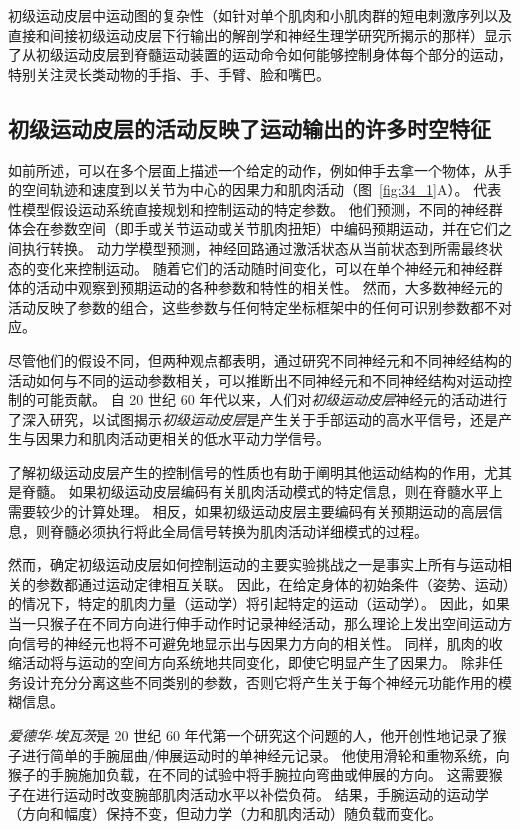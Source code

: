 初级运动皮层中运动图的复杂性（如针对单个肌肉和小肌肉群的短电刺激序列以及直接和间接初级运动皮层下行输出的解剖学和神经生理学研究所揭示的那样）显示了从初级运动皮层到脊髓运动装置的运动命令如何能够控制身体每个部分的运动，特别关注灵长类动物的手指、手、手臂、脸和嘴巴。



\subsection{初级运动皮层的活动反映了运动输出的许多时空特征}

如前所述，可以在多个层面上描述一个给定的动作，例如伸手去拿一个物体，从手的空间轨迹和速度到以关节为中心的因果力和肌肉活动（图~\ref{fig:34_1}A）。
代表性模型假设运动系统直接规划和控制运动的特定参数。
他们预测，不同的神经群体会在参数空间（即手或关节运动或关节肌肉扭矩）中编码预期运动，并在它们之间执行转换。
动力学模型预测，神经回路通过激活状态从当前状态到所需最终状态的变化来控制运动。
随着它们的活动随时间变化，可以在单个神经元和神经群体的活动中观察到预期运动的各种参数和特性的相关性。
然而，大多数神经元的活动反映了参数的组合，这些参数与任何特定坐标框架中的任何可识别参数都不对应。


尽管他们的假设不同，但两种观点都表明，通过研究不同神经元和不同神经结构的活动如何与不同的运动参数相关，可以推断出不同神经元和不同神经结构对运动控制的可能贡献。
自 20 世纪 60 年代以来，人们对\textit{初级运动皮层}神经元的活动进行了深入研究，以试图揭示\textit{初级运动皮层}是产生关于手部运动的高水平信号，还是产生与因果力和肌肉活动更相关的低水平动力学信号。


了解初级运动皮层产生的控制信号的性质也有助于阐明其他运动结构的作用，尤其是脊髓。
如果初级运动皮层编码有关肌肉活动模式的特定信息，则在脊髓水平上需要较少的计算处理。
相反，如果初级运动皮层主要编码有关预期运动的高层信息，则脊髓必须执行将此全局信号转换为肌肉活动详细模式的过程。


然而，确定初级运动皮层如何控制运动的主要实验挑战之一是事实上所有与运动相关的参数都通过运动定律相互关联。
因此，在给定身体的初始条件（姿势、运动）的情况下，特定的肌肉力量（运动学）将引起特定的运动（运动学）。
因此，如果当一只猴子在不同方向进行伸手动作时记录神经活动，那么理论上发出空间运动方向信号的神经元也将不可避免地显示出与因果力方向的相关性。
同样，肌肉的收缩活动将与运动的空间方向系统地共同变化，即使它明显产生了因果力。
除非任务设计充分分离这些不同类别的参数，否则它将产生关于每个神经元功能作用的模糊信息。


\textit{爱德华$\cdot$埃瓦茨}是 20 世纪 60 年代第一个研究这个问题的人，他开创性地记录了猴子进行简单的手腕屈曲/伸展运动时的单神经元记录。
他使用滑轮和重物系统，向猴子的手腕施加负载，在不同的试验中将手腕拉向弯曲或伸展的方向。
这需要猴子在进行运动时改变腕部肌肉活动水平以补偿负荷。
结果，手腕运动的运动学（方向和幅度）保持不变，但动力学（力和肌肉活动）随负载而变化。


